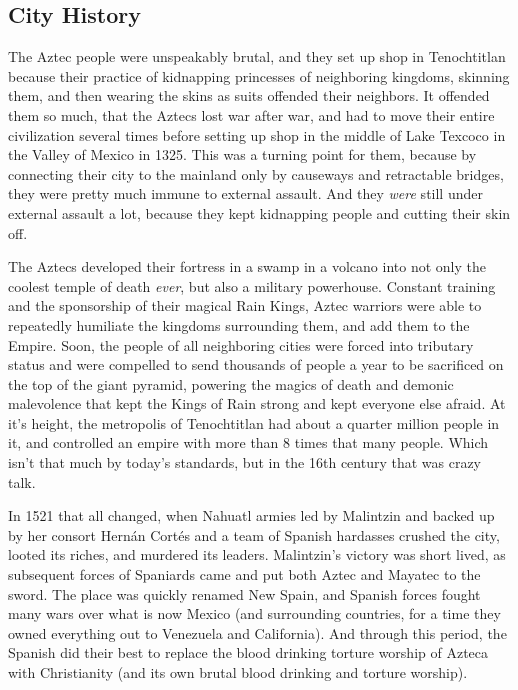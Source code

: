 \subsection{City History}

\hspace{\parindent} The Aztec people were unspeakably brutal, and they set up shop in Tenochtitlan because their practice of kidnapping princesses of neighboring kingdoms, skinning them, and then wearing the skins as suits offended their neighbors. It offended them so much, that the Aztecs lost war after war, and had to move their entire civilization several times before setting up shop in the middle of Lake Texcoco in the Valley of Mexico in 1325. This was a turning point for them, because by connecting their city to the mainland only by causeways and retractable bridges, they were pretty much immune to external assault. And they \textit{were} still under external assault a lot, because they kept kidnapping people and cutting their skin off.

The Aztecs developed their fortress in a swamp in a volcano into not only the coolest temple of death \textit{ever}, but also a military powerhouse. Constant training and the sponsorship of their magical Rain Kings, Aztec warriors were able to repeatedly humiliate the kingdoms surrounding them, and add them to the Empire. Soon, the people of all neighboring cities were forced into tributary status and were compelled to send thousands of people a year to be sacrificed on the top of the giant pyramid, powering the magics of death and demonic malevolence that kept the Kings of Rain strong and kept everyone else afraid. At it's height, the metropolis of Tenochtitlan had about a quarter million people in it, and controlled an empire with more than 8 times that many people. Which isn't that much by today's standards, but in the 16th century that was crazy talk.

In 1521 that all changed, when Nahuatl armies led by Malintzin and backed up by her consort Hern\'{a}n Cort\'{e}s and a team of Spanish hardasses crushed the city, looted its riches, and murdered its leaders. Malintzin's victory was short lived, as subsequent forces of Spaniards came and put both Aztec and Mayatec to the sword. The place was quickly renamed New Spain, and Spanish forces fought many wars over what is now Mexico (and surrounding countries, for a time they owned everything out to Venezuela and California). And through this period, the Spanish did their best to replace the blood drinking torture worship of Azteca with Christianity (and its own brutal blood drinking and torture worship).

